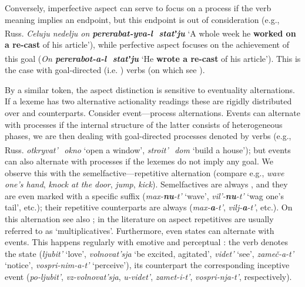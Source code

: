 \documentclass[output=paper]{langsci/langscibook}
\begin{document}
Conversely, imperfective aspect can serve to focus on a process if the verb meaning implies an endpoint, but this endpoint is out of consideration (e.g., Russ. 
\textit{Celuju nedelju on \textbf{pererabat-yva-l}}{\textsuperscript{~}\IPFV} \textit{\textbf{statʼju}} 
‘A whole week he \textbf{worked on a re-cast} of his article’),
 while perfective aspect focuses on the achievement of this goal 
(\textit{On \textbf{pererabot-a-l}}{\textsuperscript{~}\PFV} \textit{\textbf{statʼju}} 
‘He \textbf{wrote a re-cast} of his article’).
This is the case with goal-directed (i.e. ) verbs (on which see ). 

By a similar token, the aspect distinction is sensitive to eventuality alternations. If a lexeme has two alternative actionality readings these are rigidly distributed over  and  counterparts. Consider event—process alternations. Events can alternate with processes if the internal structure of the latter consists of heterogeneous phases, we are then dealing with goal-directed processes denoted by  verbs (e.g., Russ. \textit{otkryvat’}{\textsuperscript{~}\IPFV} \textit{okno} ‘open a window’, \textit{stroit’}{\textsuperscript{~}\IPFV} \textit{dom} ‘build a house’); but events can also alternate with processes if the lexemes do not imply any goal. We observe this with the semel\-fac\-tive—repe\-ti\-tive alternation (compare e.g., \textit{wave one’s hand}, \textit{knock at the door}, \textit{jump}, \textit{kick}). Semelfactives are always , and they are even marked with a specific suffix (\textit{max-\textbf{nu}-t’} ‘wave’, 
\textit{vil’-\textbf{{nu}}-t’} 
‘wag one’s tail’, etc.); their repetitive counterparts are always  (\textit{max-\textbf{a}-t’}, \textit{vilj-\textbf{{a}}-t’}, etc.). On this alternation see also ; in the literature on  aspect repetitives are usually referred to as ‘multiplicatives’. Furthermore, even states can alternate with events. This happens regularly with emotive and perceptual : the  verb denotes the state (\textit{ljubit’} {{‘love’,}} \textit{volnovat’sja} {{‘be excited, agitated’,}} \textit{videt’} {{‘see’,}} \textit{zameč-a-t’} {{‘notice’,}} \textit{vospri-nim-a-t’} {{‘perceive’}}), its  counterpart the corresponding inceptive event (\textit{po-ljubit’}, \textit{vz-volnovat’sja}, \textit{u-videt’}, \textit{zamet-i-t’}, \textit{vospri-nja-t’}, respectively).
\end{document}
